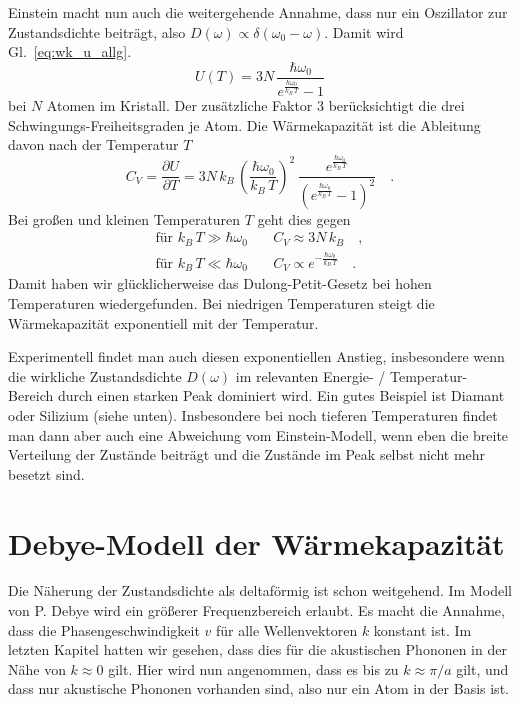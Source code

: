 Einstein macht nun auch die weitergehende Annahme, dass nur ein Oszillator zur  Zustandsdichte beiträgt, also $D(\omega) \propto \delta(\omega_0 - \omega)$. Damit wird Gl.~\ref{eq:wk_u_allg}.
\begin{equation}
U(T) =  3N \, \frac{\hbar \omega_0 }{e^{\frac{\hbar \omega_0}{k_B \, T} }- 1}
\end{equation}
bei $N$ Atomen im Kristall. Der zusätzliche Faktor 3 berücksichtigt die drei Schwingungs-Freiheitsgraden je Atom. Die Wärmekapazität ist die Ableitung davon nach der Temperatur $T$
\begin{equation}
C_V = \frac{\partial U}{\partial T }  =3 N \, k_B \, 
\left( \frac{\hbar \omega_0}{k_B \, T} \right)^2 
\, \frac{e^{\frac{\hbar \omega_0}{k_B \, T} }}
{\left( e^{\frac{\hbar \omega_0}{k_B \, T} }- 1 \right)^2} \quad . \label{eq:wk_einstein_full}
\end{equation}
Bei großen und kleinen Temperaturen $T$ geht dies gegen
\begin{align}
\text{für } k_B \, T \gg \hbar \omega_0  \quad & C_V \approx 3 N \, k_B \quad , \\
\text{für } k_B \, T \ll \hbar \omega_0  \quad & C_V \propto e^{-\frac{\hbar \omega_0}{k_B \, T} } \quad .
\end{align}
Damit haben wir glücklicherweise das Dulong-Petit-Gesetz bei hohen Temperaturen wiedergefunden. Bei niedrigen Temperaturen steigt die Wärmekapazität exponentiell mit der Temperatur.

Experimentell findet man auch diesen exponentiellen Anstieg, insbesondere wenn die wirkliche Zustandsdichte $D(\omega)$ im relevanten Energie- / Temperatur-Bereich durch einen starken Peak dominiert wird. Ein gutes Beispiel ist Diamant oder Silizium (siehe unten). Insbesondere bei noch tieferen Temperaturen findet man dann aber auch eine Abweichung vom Einstein-Modell, wenn eben die breite Verteilung der Zustände beiträgt und die Zustände im Peak selbst nicht mehr besetzt sind.



\section{Debye-Modell der Wärmekapazität}

Die Näherung der Zustandsdichte als deltaförmig ist schon weitgehend. Im Modell von P. Debye wird ein größerer Frequenzbereich erlaubt. Es macht die Annahme, dass die Phasengeschwindigkeit $v$ für alle Wellenvektoren $k$ konstant ist. Im letzten Kapitel hatten wir gesehen, dass dies für die akustischen Phononen in der Nähe von $k \approx 0$ gilt. Hier wird nun angenommen, dass es bis zu $k \approx \pi / a$ gilt, und dass nur akustische Phononen vorhanden sind, also nur ein Atom in der Basis ist.

